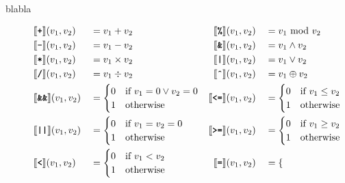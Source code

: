 blabla

\begin{figure}[ht]
    \begin{align*}
        &\llbracket \texttt{\textbf{+}} \rrbracket (v_1, v_2) &&= v_1 + v_2 &\llbracket \texttt{\textbf{\%}} \rrbracket (v_1, v_2)      &&&= v_1\ \text{mod}\ v_2\\
        &\llbracket \texttt{\textbf{-}} \rrbracket (v_1, v_2) &&= v_1 - v_2 &\llbracket \texttt{\textbf{\&}} \rrbracket (v_1, v_2)       &&&= v_1 \wedge v_2\\
        &\llbracket \texttt{\textbf{*}} \rrbracket (v_1, v_2) &&= v_1 \times v_2 &\llbracket \texttt{\textbf{|}} \rrbracket  (v_1, v_2) &&&= v_1 \vee v_2\\
        &\llbracket \texttt{\textbf{/}} \rrbracket (v_1, v_2) &&= v_1 \div v_2 &\llbracket \texttt{\textbf{\^}} \rrbracket (v_1, v_2)   &&&= v_1 \oplus v_2\\ 
        &\llbracket\texttt{\textbf{\&\&}}\rrbracket (v_1, v_2) &&= \begin{cases} 
            0 & \text{if}\ v_1 = 0 \vee v_2 = 0\\ 
            1 & \text{otherwise}
        \end{cases}        
        &\llbracket\texttt{\textbf{<=}}\rrbracket (v_1, v_2) &&&= \begin{cases} 
            0 & \text{if}\ v_1 \leq v_2\\ 
            1 & \text{otherwise} 
        \end{cases}\\
        &\llbracket\texttt{\textbf{||}}\rrbracket (v_1, v_2) &&= \begin{cases}
            0 & \text{if}\ v_1 = v_2 = 0\\ 
            1 & \text{otherwise}
        \end{cases}
        &\llbracket\texttt{\textbf{>=}}\rrbracket (v_1, v_2) &&&= \begin{cases}
            0 & \text{if}\ v_1 \geq v_2\\
            1 & \text{otherwise}
        \end{cases}\\
        &\llbracket\texttt{\textbf{<}}\rrbracket (v_1, v_2) &&= \begin{cases}
            0 & \text{if}\ v_1 < v_2\\ 
            1 & \text{otherwise}
        \end{cases}
        &\llbracket\texttt{\textbf{=}}\rrbracket (v_1, v_2) &&&= \begin{cases}

\end{cases}
\end{align*}
\end{figure}
